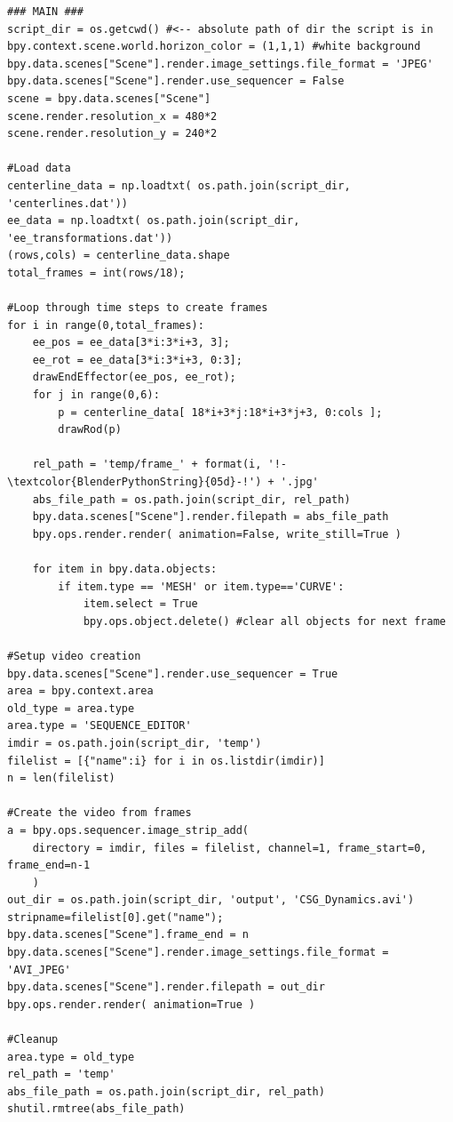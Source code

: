\documentclass[12pt]{article}
\begin{document}
\begin{lstlisting}
### MAIN ###
script_dir = os.getcwd() #<-- absolute path of dir the script is in
bpy.context.scene.world.horizon_color = (1,1,1) #white background
bpy.data.scenes["Scene"].render.image_settings.file_format = 'JPEG'
bpy.data.scenes["Scene"].render.use_sequencer = False
scene = bpy.data.scenes["Scene"]
scene.render.resolution_x = 480*2
scene.render.resolution_y = 240*2

#Load data
centerline_data = np.loadtxt( os.path.join(script_dir, 'centerlines.dat'))
ee_data = np.loadtxt( os.path.join(script_dir, 'ee_transformations.dat'))
(rows,cols) = centerline_data.shape
total_frames = int(rows/18);

#Loop through time steps to create frames
for i in range(0,total_frames):
    ee_pos = ee_data[3*i:3*i+3, 3];
    ee_rot = ee_data[3*i:3*i+3, 0:3];
    drawEndEffector(ee_pos, ee_rot);
    for j in range(0,6):
        p = centerline_data[ 18*i+3*j:18*i+3*j+3, 0:cols ];
        drawRod(p)

    rel_path = 'temp/frame_' + format(i, '!-\textcolor{BlenderPythonString}{05d}-!') + '.jpg'
    abs_file_path = os.path.join(script_dir, rel_path)
    bpy.data.scenes["Scene"].render.filepath = abs_file_path
    bpy.ops.render.render( animation=False, write_still=True )
    
    for item in bpy.data.objects:
        if item.type == 'MESH' or item.type=='CURVE':
            item.select = True
            bpy.ops.object.delete() #clear all objects for next frame

#Setup video creation
bpy.data.scenes["Scene"].render.use_sequencer = True
area = bpy.context.area
old_type = area.type
area.type = 'SEQUENCE_EDITOR'
imdir = os.path.join(script_dir, 'temp')
filelist = [{"name":i} for i in os.listdir(imdir)]
n = len(filelist)

#Create the video from frames
a = bpy.ops.sequencer.image_strip_add(
    directory = imdir, files = filelist, channel=1, frame_start=0, frame_end=n-1
    )
out_dir = os.path.join(script_dir, 'output', 'CSG_Dynamics.avi')
stripname=filelist[0].get("name");
bpy.data.scenes["Scene"].frame_end = n
bpy.data.scenes["Scene"].render.image_settings.file_format = 'AVI_JPEG'
bpy.data.scenes["Scene"].render.filepath = out_dir 
bpy.ops.render.render( animation=True )

#Cleanup
area.type = old_type
rel_path = 'temp'
abs_file_path = os.path.join(script_dir, rel_path)
shutil.rmtree(abs_file_path)
\end{lstlisting}
\end{document}
